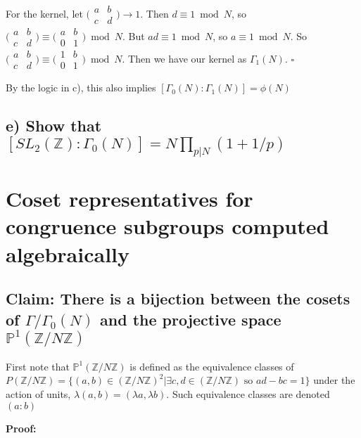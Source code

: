 \documentclass[11pt, oneside]{article}   	%
\begin{document}
For the kernel, let $\bigl( \begin{smallmatrix}a & b\\ c & d\end{smallmatrix}\bigr)\rightarrow 1$. Then $d\equiv 1 \bmod N$, so $\bigl( \begin{smallmatrix}a & b\\ c & d\end{smallmatrix}\bigr)\equiv \bigl( \begin{smallmatrix}a & b\\ 0 & 1\end{smallmatrix}\bigr)\bmod N$. But $ad\equiv 1\bmod N$, so $a\equiv 1 \bmod N$. So $\bigl( \begin{smallmatrix}a & b\\ c & d\end{smallmatrix}\bigr) \equiv \bigl( \begin{smallmatrix}1 & b\\ 0 & 1\end{smallmatrix}\bigr)\bmod N$. Then we have our kernel as $\Gamma_1 (N)$. $\square$

By the logic in c), this also implies $[\Gamma_0 (N):\Gamma_1 (N)]=\phi(N)$

\subsection*{e) Show that $[SL_2(\mathbb{Z}):\Gamma_0 (N)]=N\prod_{p\vert N} (1+1/p)$}

\section*{Coset representatives for congruence subgroups computed algebraically}

\subsection*{Claim: There is a bijection between the cosets of $\Gamma/\Gamma_0 (N)$ and the projective space $\mathbb{P}^1(\mathbb{Z}/N\mathbb{Z})$}

First note that $\mathbb{P}^1(\mathbb{Z}/N\mathbb{Z})$ is defined as the equivalence classes of $P(\mathbb{Z}/N\mathbb{Z})=\{(a,b)\in (\mathbb{Z}/N\mathbb{Z})^2\vert \exists c,d \in (\mathbb{Z}/N\mathbb{Z}) \text{ so } ad-bc=1\}$ under the action of units, $\lambda (a,b)=(\lambda a, \lambda b)$. Such equivalence classes are denoted $(a:b)$

\textbf{Proof:}
\end{document}
